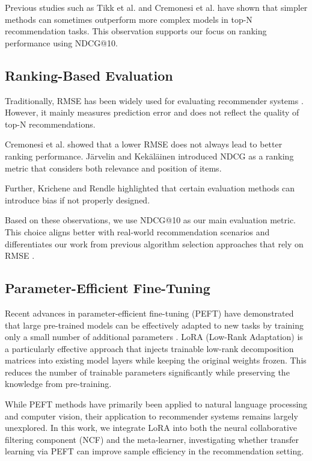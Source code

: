 \documentclass[conference]{IEEEtran}
\begin{document}
Previous studies such as Tikk et al. \cite{tikk2009study} and Cremonesi et al. \cite{cremonesi2010performance} have shown that simpler methods can sometimes outperform more complex models in top-N recommendation tasks. This observation supports our focus on ranking performance using NDCG@10.

\subsection{Ranking-Based Evaluation}

Traditionally, RMSE has been widely used for evaluating recommender systems \cite{koren2009matrix}. However, it mainly measures prediction error and does not reflect the quality of top-N recommendations.

Cremonesi et al. \cite{cremonesi2010performance} showed that a lower RMSE does not always lead to better ranking performance. J\"{a}rvelin and Kek\"{a}l\"{a}inen \cite{jarvelin2002ndcg} introduced NDCG as a ranking metric that considers both relevance and position of items.

Further, Krichene and Rendle \cite{krichene2020sampled} highlighted that certain evaluation methods can introduce bias if not properly designed.

Based on these observations, we use NDCG@10 as our main evaluation metric. This choice aligns better with real-world recommendation scenarios and differentiates our work from previous algorithm selection approaches that rely on RMSE \cite{cunha2018metalearning}.

\subsection{Parameter-Efficient Fine-Tuning}

Recent advances in parameter-efficient fine-tuning (PEFT) have demonstrated that large pre-trained models can be effectively adapted to new tasks by training only a small number of additional parameters \cite{hu2022lora, houlsby2019adapters, li2021prefix}. LoRA (Low-Rank Adaptation) \cite{hu2022lora} is a particularly effective approach that injects trainable low-rank decomposition matrices into existing model layers while keeping the original weights frozen. This reduces the number of trainable parameters significantly while preserving the knowledge from pre-training.

While PEFT methods have primarily been applied to natural language processing and computer vision, their application to recommender systems remains largely unexplored. In this work, we integrate LoRA into both the neural collaborative filtering component (NCF) and the meta-learner, investigating whether transfer learning via PEFT can improve sample efficiency in the recommendation setting.
\end{document}
